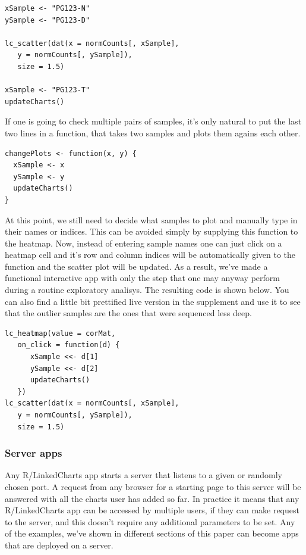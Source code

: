 \documentclass[twocolumn,10pt]{article}
\begin{document}
\begin{verbatim}
xSample <- "PG123-N"
ySample <- "PG123-D"

lc_scatter(dat(x = normCounts[, xSample], 
   y = normCounts[, ySample]),
   size = 1.5)

xSample <- "PG123-T"
updateCharts()
\end{verbatim}

If one is going to check multiple pairs of samples, it's only natural to put the last two lines in a function, that takes two samples and plots them agains each other.

\begin{verbatim}
changePlots <- function(x, y) {
  xSample <- x
  ySample <- y
  updateCharts()
}
\end{verbatim}

At this point, we still need to decide what samples to plot and manually type in their names or indices. This can be avoided simply by supplying this function to the heatmap. Now, instead of entering sample names one can just click on a heatmap cell and it's row and column indices will be automatically given to the function and the scatter plot will be updated. As a result, we've made a functional interactive app with only the step that one may anyway perform during a routine exploratory analisys. The resulting code is shown below. You can also find a little bit prettified live version in the supplement and use it to see that the outlier samples are the ones that were sequenced less deep.

\begin{verbatim}
lc_heatmap(value = corMat,
   on_click = function(d) {
      xSample <<- d[1]
      ySample <<- d[2]
      updateCharts()
   })
lc_scatter(dat(x = normCounts[, xSample], 
   y = normCounts[, ySample]),
   size = 1.5)
\end{verbatim}

\subsubsection{Server apps}

Any R/LinkedCharts app starts a server that listens to a given or randomly chosen port. A request from any browser for a starting page to this server will be answered with all the charts user has added so far. In practice it means that any R/LinkedCharts app can be accessed by multiple users, if they can make request to the server, and this doesn't require any additional parameters to be set. Any of the examples, we've shown in different sections of this paper can become apps that are deployed on a server.
\end{document}
